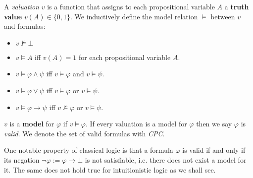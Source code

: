 \documentclass[a4paper,UKenglish,cleveref, autoref, thm-restate]{lipics-v2021}
\begin{document}
\begin{definition}
	A \emph{valuation} $v$ is a function that assigns to each propositional variable $A$ a \textbf{truth value} $v(A)\in\{0, 1\}$. We inductively define the model relation $\models$ between $v$ and formulas:
	\begin{itemize}
		\item $v\not\models \bot$
		\item $v\models A$ iff $v(A) = 1$ for each propositional variable $A$.
		\item $v\models \varphi\wedge\psi$ iff $v\models\varphi$ and $v\models\psi$.
		\item $v\models\varphi\vee\psi$ iff $v\models\varphi$ or $v\models\psi$.
		\item $v\models\varphi\to \psi$ iff $v\not\models\varphi$ or $v\models\psi$.
	\end{itemize}
	$v$ is a \textbf{model} for $\varphi$ if $v\models\varphi$. If every valuation is a model for $\varphi$ then we say $\varphi$ is \emph{valid}. We denote the set of valid formulas with \emph{CPC}.
\end{definition}

One notable property of classical logic is that a formula $\varphi$ is valid if and only if its negation $\neg\varphi := \varphi\to\bot$ is not satisfiable, i.e. there does not exist a model for it. The same does not hold true for intuitionistic logic as we shall see.
\end{document}
